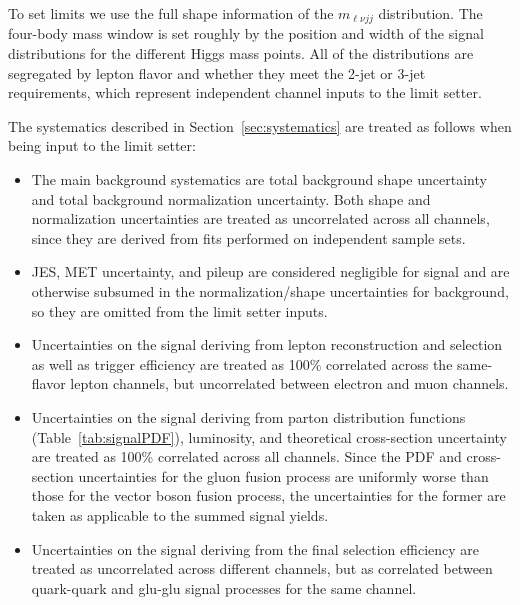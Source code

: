 To set limits we use the full shape information of the $m_{\ell\nu
jj}$ distribution.  The four-body mass window is set roughly by the
position and width of the signal distributions for the different Higgs
mass points. All of the distributions are segregated by lepton flavor
and whether they meet the 2-jet or 3-jet requirements, which represent
independent channel inputs to the limit setter.

The systematics described in Section~\ref{sec:systematics} are treated
as follows when being input to the limit setter:
\begin{itemize}
\item The main background systematics are total background shape
uncertainty and total background normalization uncertainty. 
Both shape and normalization uncertainties are
treated as uncorrelated across all channels, since they are derived
from fits performed on independent sample sets.
\item JES, MET uncertainty, and pileup are considered negligible for
signal and are otherwise subsumed in the normalization/shape
uncertainties for background, so they are omitted from the limit setter
inputs.
\item Uncertainties on the signal deriving from lepton reconstruction
and selection as well as trigger efficiency are treated as 100\%
correlated across the same-flavor lepton channels, but uncorrelated
between electron and muon channels.
\item Uncertainties on the signal deriving from parton distribution
functions (Table~\ref{tab:signalPDF}), luminosity, and theoretical
cross-section uncertainty are treated as 100\% correlated across all
channels. Since the PDF and cross-section uncertainties for the gluon
fusion process are uniformly worse than those for the vector boson
fusion process, the uncertainties for the former are taken as
applicable to the summed signal yields.
\item Uncertainties on the signal deriving from the final selection
efficiency are treated as uncorrelated across different channels, but as
correlated between quark-quark and glu-glu signal processes for the same
channel.
\end{itemize}

